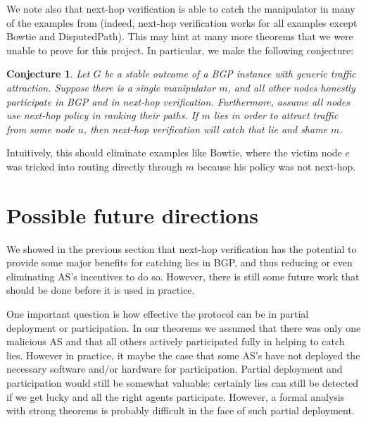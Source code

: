 \documentclass[10pt]{article}
\newtheorem{conjecture}{Conjecture}
\begin{document}
  We note also that next-hop verification is able to catch the manipulator in
  many of the examples from \cite{Attraction} (indeed, next-hop verification
  works for all examples except Bowtie and DisputedPath).
  This may hint at many more theorems that we were unable to prove for this
  project. In particular, we make the following conjecture:
  \begin{conjecture}
    Let $G$ be a stable outcome of a BGP instance with generic traffic attraction.
    Suppose there is a single manipulator $m$,
    and all other nodes honestly participate in BGP and in next-hop verification.
    Furthermore, assume all nodes use next-hop policy in ranking their paths.
    If $m$ lies in order to attract traffic from some node $u$,
    then next-hop verification will catch that lie and shame $m$.
  \end{conjecture}
  Intuitively, this should eliminate examples like Bowtie, where the victim node
  $c$ was tricked into routing directly through $m$ because his policy was not
  next-hop.


\section{Possible future directions}


  We showed in the previous section that next-hop verification has the potential
  to provide some major benefits for catching lies in BGP, and thus reducing or
  even eliminating AS's incentives to do so. However, there is still some future
  work that should be done before it is used in practice.

  One important question is how effective the protocol can be in partial
  deployment or participation. In our theorems we assumed that there was only
  one malicious AS and that all others actively participated fully in helping to
  catch lies. However in practice, it maybe the case that some AS's have not
  deployed the necessary software and/or hardware for participation.
  Partial deployment and participation would still be somewhat valuable:
  certainly lies can still be detected if we get lucky and all the right agents
  participate. However, a formal analysis with strong theorems is probably
  difficult in the face of such partial deployment.
\end{document}
